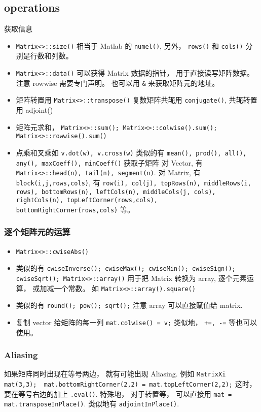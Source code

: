 \subsection{operations}
获取信息
\begin{itemize}
\item \verb|Matrix<>::size()| 相当于 Matlab 的 \verb|numel()|, 另外， \verb|rows()| 和 \verb|cols()| 分别是行数和列数。
\item \verb|Matrix<>::data()| 可以获得 Matrix 数据的指针， 用于直接读写矩阵数据。 注意 rowwise 需要专门声明。 也可以用 \verb|&| 来获取矩阵元的地址。
\item 矩阵转置用 \verb|Matrix<>::transpose()| 复数矩阵共轭用 \verb|conjugate()|, 共轭转置用 adjoint()
\item 矩阵元求和， \verb|Matrix<>::sum(); Matrix<>::colwise().sum(); Matrix<>::rowwise().sum()|
\item 点乘和叉乘如 \verb|v.dot(w), v.cross(w)|
类似的有 \verb|mean(), prod(), all(), any(), maxCoeff(), minCoeff()|
获取子矩阵
对 Vector, 有 \verb|Matrix<>::head(n), tail(n), segment(n)|. 对 Matrix, 有 \verb|block(i,j,rows,cols)|, 有 \verb|row(i), col(j), topRows(n), middleRows(i, rows), bottomRows(n), leftCols(n), middleCols(j, cols), rightCols(n), topLeftCorner(rows,cols), bottomRightCorner(rows,cols)| 等。
\end{itemize}


\subsubsection{逐个矩阵元的运算}
\begin{itemize}
\item \verb|Matrix<>::cwiseAbs()|
\item 类似的有 \verb|cwiseInverse(); cwiseMax(); cwiseMin(); cwiseSign(); cwiseSqrt(); Matrix<>::array()| 用于把 Matrix 转换为 array, 逐个元素运算， 或加减一个常数。 如 \verb|Matrix<>::array().square()|
\item 类似的有 \verb|round(); pow(); sqrt();| 注意 array 可以直接赋值给 matrix.
\item 复制 vector 给矩阵的每一列 \verb|mat.colwise() = v;| 类似地， \verb|+=, -=| 等也可以使用。
\end{itemize}


\subsubsection{Aliasing}
如果矩阵同时出现在等号两边， 就有可能出现 Aliasing. 例如 \verb|MatrixXi mat(3,3);  mat.bottomRightCorner(2,2) = mat.topLeftCorner(2,2);| 这时， 要在等号右边的加上 \verb|.eval()|. 特殊地， 对于转置等， 可以直接用 \verb|mat = mat.transposeInPlace()|. 类似地有 \verb|adjointInPlace()|.

